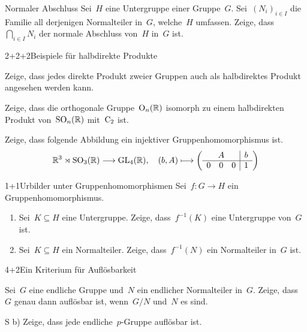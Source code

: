 \documentclass{algblatt}
\begin{document}

\begin{aufgabe}{2}{Normaler Abschluss}
Sei~$H$ eine Untergruppe einer Gruppe~$G$. Sei~$(N_i)_{i \in I}$ die Familie
all derjenigen Normalteiler in~$G$, welche~$H$ umfassen. Zeige,
dass~$\bigcap_{i \in I} N_i$ der normale Abschluss von~$H$ in~$G$ ist.
\end{aufgabe}

\begin{aufgabeE}{2+2+2}{Beispiele für halbdirekte Produkte}
\item Zeige, dass jedes direkte Produkt zweier Gruppen auch als halbdirektes
Produkt angesehen werden kann.
\item Zeige, dass die orthogonale Gruppe~$\mathrm{O}_n(\mathbb{R})$ isomorph zu einem
halbdirekten Produkt von~$\mathrm{SO}_n(\mathbb{R})$ mit~$\mathrm{C}_2$ ist.
\item Zeige, dass folgende Abbildung ein injektiver Gruppenhomomorphismus ist.
\[ \RR^3 \rtimes \SO_3(\RR) \longrightarrow \GL_4(\RR),\quad
  (b, A) \longmapsto \left(\begin{array}{ccc|c}
    \multicolumn{3}{c|}{A} & b \\\hline
    0 & 0 & 0 & 1
  \end{array}\right) \]
\end{aufgabeE}
\vspace{-1em}

\begin{aufgabe}{1+1}{Urbilder unter Gruppenhomomorphismen}
Sei~$f : G \to H$ ein Gruppenhomomorphismus.
\begin{enumerate}
\item Sei~$K \subseteq H$ eine Untergruppe. Zeige, dass~$f^{-1}(K)$
eine Untergruppe von~$G$ ist.
\item Sei~$K \subseteq H$ ein Normalteiler. Zeige, dass~$f^{-1}(N)$
ein Normalteiler in~$G$ ist.
\end{enumerate}
\end{aufgabe}

\begin{aufgabeE}{4+2}{Ein Kriterium für Auflösbarkeit}
\item Sei~$G$ eine endliche Gruppe und~$N$ ein endlicher Normalteiler in~$G$.
Zeige, dass~$G$ genau dann auflösbar ist, wenn~$G/N$ und~$N$ es sind.
\item[S b)] Zeige, dass jede endliche~$p$-Gruppe auflösbar ist.
\end{aufgabeE}
\end{document}
